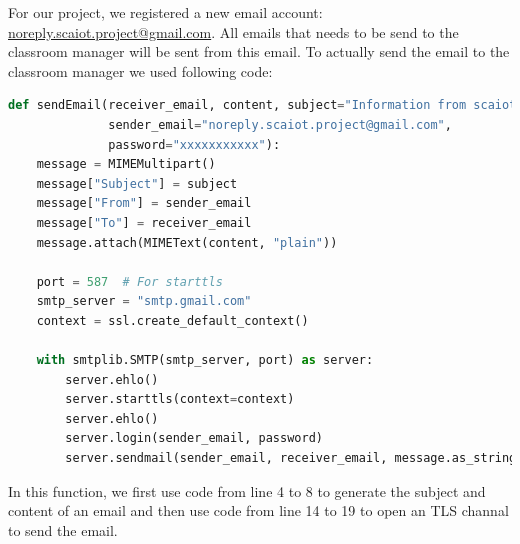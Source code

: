 \documentclass[runningheads]{llncs}
\begin{document}
For our project, we registered a new email account: \url{noreply.scaiot.project@gmail.com}. All emails that needs to be send to the classroom manager will be sent from this email. To actually send the email to the classroom manager we used following code:
\begin{lstlisting}[language=python]
def sendEmail(receiver_email, content, subject="Information from scaiot project",
              sender_email="noreply.scaiot.project@gmail.com",
              password="xxxxxxxxxxx"):
    message = MIMEMultipart()
    message["Subject"] = subject
    message["From"] = sender_email
    message["To"] = receiver_email
    message.attach(MIMEText(content, "plain"))

    port = 587  # For starttls
    smtp_server = "smtp.gmail.com"
    context = ssl.create_default_context()

    with smtplib.SMTP(smtp_server, port) as server:
        server.ehlo()  
        server.starttls(context=context)
        server.ehlo()  
        server.login(sender_email, password)
        server.sendmail(sender_email, receiver_email, message.as_string())
\end{lstlisting}
In this function, we first use code from line 4 to 8 to generate the subject and content of an email and then use code from line 14 to 19 to open an TLS channal to send the email.
\end{document}
